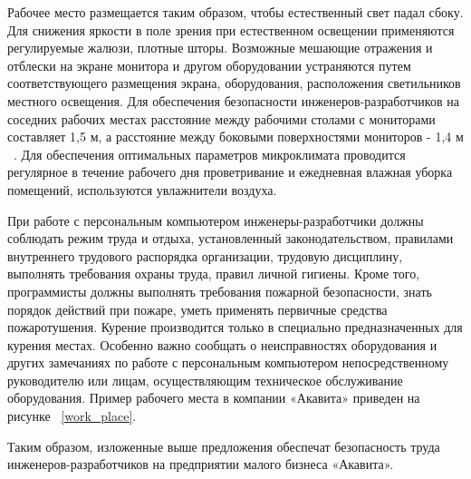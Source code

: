 Рабочее место размещается таким образом, чтобы естественный свет падал сбоку. Для снижения яркости в поле зрения при естественном освещении применяются регулируемые жалюзи, плотные шторы. Возможные мешающие отражения и отблески на экране монитора и другом оборудовании устраняются путем соответствующего размещения экрана, оборудования, расположения светильников местного освещения. Для обеспечения безопасности инженеров-разработчиков на соседних рабочих местах расстояние между рабочими столами с мониторами составляет 1,5 м, а расстояние между боковыми поверхностями мониторов - 1,4 м ~\cite{ot_2}. Для обеспечения оптимальных параметров микроклимата проводится регулярное в течение рабочего дня проветривание и ежедневная влажная уборка помещений, используются увлажнители воздуха.

При работе с персональным компьютером инженеры-разработчики должны соблюдать режим труда и отдыха, установленный законодательством, правилами внутреннего трудового распорядка организации, трудовую дисциплину, выполнять требования охраны труда, правил личной гигиены. Кроме того, программисты должны выполнять требования пожарной безопасности, знать порядок действий при пожаре, уметь применять первичные средства пожаротушения. Курение производится только в специально предназначенных для курения местах. Особенно важно сообщать о неисправностях оборудования и других замечаниях по работе с персональным компьютером непосредственному руководителю или лицам, осуществляющим техническое обслуживание оборудования. Пример рабочего места в компании «Акавита» приведен на рисунке ~\ref{work_place}.


Таким образом, изложенные выше предложения обеспечат безопасность труда инженеров-разработчиков на предприятии малого бизнеса «Акавита».

